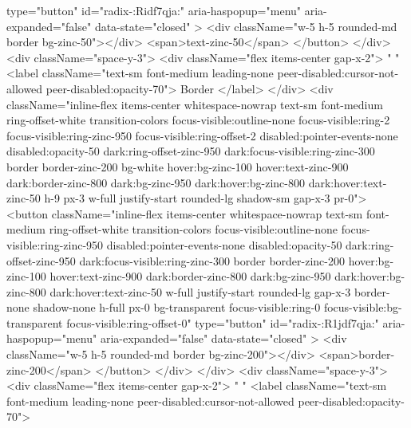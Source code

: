 {                      type="button"
                      id="radix-:Ridf7qja:"
                      aria-haspopup="menu"
                      aria-expanded="false"
                      data-state="closed"
                    >
                      <div className="w-5 h-5 rounded-md border bg-zinc-50"></div>
                      <span>text-zinc-50</span>
                    </button>
                  </div>
                  <div className="space-y-3">
                    <div className="flex items-center gap-x-2">
                      {" "}
                      <label className="text-sm font-medium leading-none peer-disabled:cursor-not-allowed peer-disabled:opacity-70">
                        Border
                      </label>
                    </div>
                    <div className="inline-flex items-center whitespace-nowrap text-sm font-medium ring-offset-white transition-colors focus-visible:outline-none focus-visible:ring-2 focus-visible:ring-zinc-950 focus-visible:ring-offset-2 disabled:pointer-events-none disabled:opacity-50 dark:ring-offset-zinc-950 dark:focus-visible:ring-zinc-300 border border-zinc-200 bg-white hover:bg-zinc-100 hover:text-zinc-900 dark:border-zinc-800 dark:bg-zinc-950 dark:hover:bg-zinc-800 dark:hover:text-zinc-50 h-9 px-3 w-full justify-start rounded-lg shadow-sm gap-x-3 pr-0">
                      <button
                        className="inline-flex items-center whitespace-nowrap text-sm font-medium ring-offset-white transition-colors focus-visible:outline-none focus-visible:ring-zinc-950 disabled:pointer-events-none disabled:opacity-50 dark:ring-offset-zinc-950 dark:focus-visible:ring-zinc-300 border border-zinc-200 hover:bg-zinc-100 hover:text-zinc-900 dark:border-zinc-800 dark:bg-zinc-950 dark:hover:bg-zinc-800 dark:hover:text-zinc-50 w-full justify-start rounded-lg gap-x-3 border-none shadow-none h-full px-0 bg-transparent focus-visible:ring-0 focus-visible:bg-transparent focus-visible:ring-offset-0"
                        type="button"
                        id="radix-:R1jdf7qja:"
                        aria-haspopup="menu"
                        aria-expanded="false"
                        data-state="closed"
                      >
                        <div className="w-5 h-5 rounded-md border bg-zinc-200"></div>
                        <span>border-zinc-200</span>
                      </button>
                    </div>
                  </div>
                  <div className="space-y-3">
                    <div className="flex items-center gap-x-2">
                      {" "}
                      <label className="text-sm font-medium leading-none peer-disabled:cursor-not-allowed peer-disabled:opacity-70">
}
